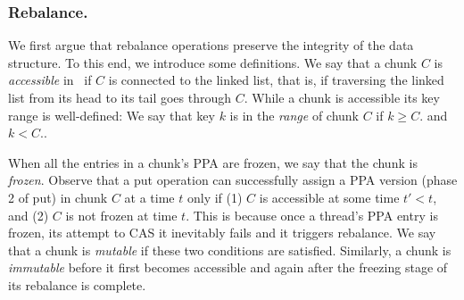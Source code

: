 \subsubsection{Rebalance.}
\label{ssec:rebalance-proof}

We first argue that rebalance operations preserve the integrity of the data structure.  
To this end, we introduce some definitions. 
We say that a chunk $C$ is \emph{accessible} in \kiwi\ if $C$ is connected to the linked list, 
that is, if traversing the linked list from its head to its tail goes through $C$. 
While a chunk is accessible its key range is well-defined: 
We say that key $k$ is in the \emph{range} of chunk $C$ if $k \geq C$. and $k < C.$.

When all the entries in a chunk's PPA are frozen, we say that the chunk is \emph{frozen}. 
Observe that a put operation can successfully assign a PPA version (phase 2 of put) in chunk $C$ at a time $t$ only if  (1) $C$ is accessible  at some time $t'<t$, 
and (2) $C$ is not frozen at time $t$. This is because once a thread's PPA entry is frozen, its attempt to CAS it inevitably fails and it triggers rebalance.
We say that a chunk is \emph{mutable} if these two conditions are satisfied. Similarly, a chunk is \emph{immutable} before it first becomes accessible 
and again after the freezing stage of its rebalance is complete. 

